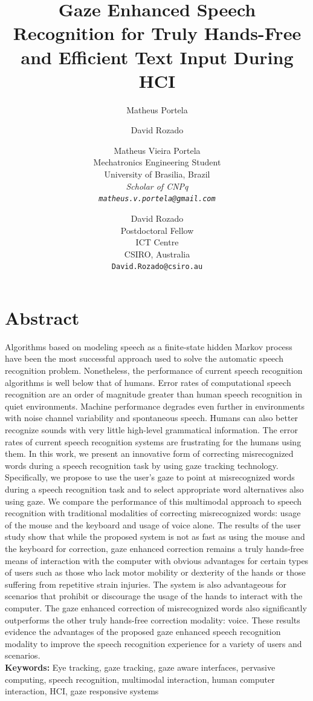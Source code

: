 \documentclass[]{article}
\title{Gaze Enhanced Speech Recognition for Truly Hands-Free and Efficient Text Input During HCI}
\author{Matheus Portela}
\author{David Rozado}
\author{
  Matheus Vieira Portela\\
  Mechatronics Engineering Student\\
  University of Brasilia, Brazil\\
  \em{Scholar of CNPq}\\
  \texttt{matheus.v.portela@gmail.com}\\
  \and
  David Rozado\\
  Postdoctoral Fellow\\
  ICT Centre\\
  CSIRO, Australia\\
  \texttt{David.Rozado@csiro.au}
}
\begin{document}
\maketitle

\section{Abstract}
Algorithms based on modeling speech as a finite-state hidden Markov process have been the most successful approach used
to solve the automatic speech recognition problem. Nonetheless, the performance of current speech recognition algorithms
is well below that of humans. Error rates of computational speech recognition are an order of magnitude greater than
human speech recognition in quiet environments. Machine performance degrades even further in environments with noise
channel variability and spontaneous speech. Humans can also better recognize sounds with very little high-level
grammatical information. The error rates of current speech recognition systems are frustrating for the humans using
them. In this work, we present an innovative form of correcting misrecognized words during a speech recognition task by
using gaze tracking technology. Specifically, we propose to use the user's gaze to point at misrecognized words during a
speech recognition task and to select appropriate word alternatives also using gaze. We compare  the performance of this
multimodal approach to speech recognition with traditional modalities of correcting misrecognized words: usage of the
mouse and the keyboard and usage of voice alone. The results of the user study show that while the proposed system is
not as fast as using the mouse and the keyboard for correction, gaze enhanced correction remains a truly hands-free
means of interaction with the computer with obvious advantages for certain types of users such as those who lack  motor
mobility or dexterity of the hands or those suffering from repetitive strain injuries. The system is also advantageous
for scenarios that prohibit or discourage the usage of the hands to interact with the computer. The gaze enhanced
correction of misrecognized words also significantly outperforms the other truly hands-free correction modality: voice.
These results evidence the advantages of the proposed gaze enhanced speech recognition modality to improve the speech
recognition experience for a variety of users and scenarios.\\


\textbf{Keywords:} Eye tracking, gaze tracking, gaze aware interfaces, pervasive computing, speech recognition,
multimodal interaction, human computer interaction, HCI, gaze responsive systems 
\end{document}
